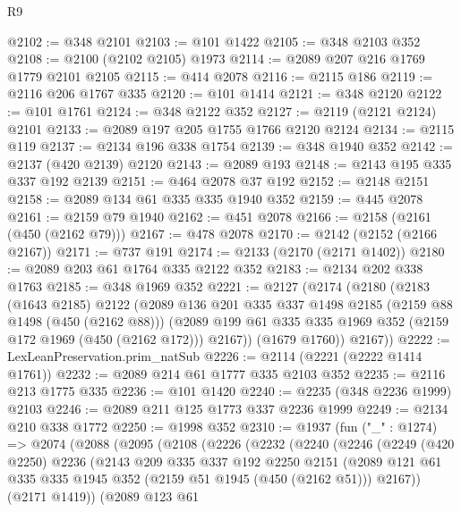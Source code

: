 \begin{lexlean}{R9}
\begin{coremodule}
@2102 := @348 @2101
@2103 := @101 @1422
@2105 := @348 @2103 @352
@2108 := @2100 (@2102 @2105) @1973
@2114 := @2089 @207 @216 @1769 @1779 @2101 @2105
@2115 := @414 @2078
@2116 := @2115 @186
@2119 := @2116 @206 @1767 @335
@2120 := @101 @1414
@2121 := @348 @2120
@2122 := @101 @1761
@2124 := @348 @2122 @352
@2127 := @2119 (@2121 @2124) @2101
@2133 := @2089 @197 @205 @1755 @1766 @2120 @2124
@2134 := @2115 @119
@2137 := @2134 @196 @338 @1754
@2139 := @348 @1940 @352
@2142 := @2137 (@420 @2139) @2120
@2143 := @2089 @193
@2148 := @2143 @195 @335 @337 @192 @2139
@2151 := @464 @2078 @37 @192
@2152 := @2148 @2151
@2158 := @2089 @134 @61 @335 @335 @1940 @352
@2159 := @445 @2078
@2161 := @2159 @79 @1940
@2162 := @451 @2078
@2166 := @2158 (@2161 (@450 (@2162 @79)))
@2167 := @478 @2078
@2170 := @2142 (@2152 (@2166 @2167))
@2171 := @737 @191
@2174 := @2133 (@2170 (@2171 @1402))
@2180 := @2089 @203 @61 @1764 @335 @2122 @352
@2183 := @2134 @202 @338 @1763
@2185 := @348 @1969 @352
@2221 := @2127
    (@2174
      (@2180
        (@2183
          (@1643 @2185)
          @2122
          (@2089
            @136
            @201
            @335
            @337
            @1498
            @2185
            (@2159 @88 @1498 (@450 (@2162 @88)))
            (@2089 @199 @61 @335 @335 @1969 @352 (@2159 @172 @1969 (@450 (@2162 @172))) @2167))
          (@1679 @1760))
        @2167))
@2222 := LexLeanPreservation.prim_natSub
@2226 := @2114 (@2221 (@2222 @1414 @1761))
@2232 := @2089 @214 @61 @1777 @335 @2103 @352
@2235 := @2116 @213 @1775 @335
@2236 := @101 @1420
@2240 := @2235 (@348 @2236 @1999) @2103
@2246 := @2089 @211 @125 @1773 @337 @2236 @1999
@2249 := @2134 @210 @338 @1772
@2250 := @1998 @352
@2310 := @1937
    (fun ("_" : @1274) =>
    @2074
      (@2088
        (@2095
          (@2108
            (@2226
              (@2232
                (@2240
                  (@2246
                    (@2249
                      (@420 @2250)
                      @2236
                      (@2143
                        @209
                        @335
                        @337
                        @192
                        @2250
                        @2151
                        (@2089
                          @121
                          @61
                          @335
                          @335
                          @1945
                          @352
                          (@2159 @51 @1945 (@450 (@2162 @51)))
                          @2167))
                      (@2171 @1419))
                    (@2089
                      @123
                      @61

\end{coremodule}
\end{lexlean}
